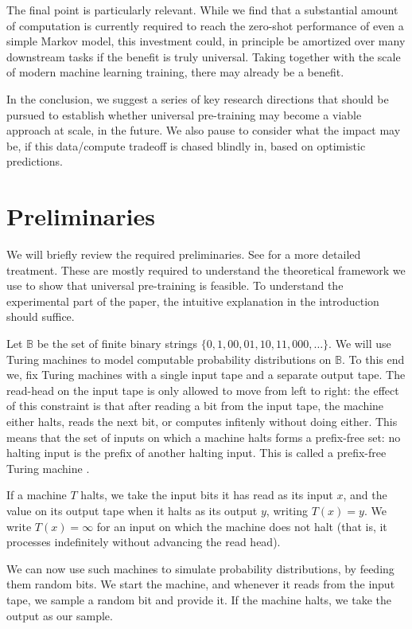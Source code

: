 \documentclass{article} %
\newcommand{\B}{\mathbb B}
\begin{document}
The final point is particularly relevant. While we find that a substantial amount of computation is currently required to reach the zero-shot performance of even a simple Markov model, this investment could, in principle be amortized over many downstream tasks if the benefit is truly universal. Taking together with the scale of modern machine learning training, there may already be a benefit. 

In the conclusion, we suggest a series of key research directions that should be pursued to establish whether universal pre-training may become a viable approach at scale, in the future. We also pause to consider what the impact may be, if this data/compute tradeoff is chased blindly in, based on optimistic predictions.

\section{Preliminaries}

We will briefly review the required preliminaries. See \cite{} for a more detailed treatment. These are mostly required to understand the theoretical framework we use to show that universal pre-training is feasible. To understand the experimental part of the paper, the intuitive explanation in the introduction should suffice.

Let $\B$ be the set of finite binary strings $\{0, 1, 00, 01, 10, 11, 000, \ldots\}$. We will use Turing machines \cite{} to model computable probability distributions on $\B$. To this end we, fix Turing machines with a single input tape and a separate output tape. The read-head on the input tape is only allowed to move from left to right: the effect of this constraint is that after reading a bit from the input tape, the machine either halts, reads the next bit, or computes infitenly without doing either. This means that the set of inputs on which a machine halts forms a prefix-free set: no halting input is the prefix of another halting input.  This is called a prefix-free Turing machine \cite{}.

If a machine $T$ halts, we take the input bits it has read as its input $x$, and the value on its output tape when it halts as its output $y$, writing $T(x) = y$. We write $T(x)=\infty$ for an input on which the machine does not halt (that is, it processes indefinitely without advancing the read head).

We can now use such machines to simulate probability distributions, by feeding them random bits. We start the machine, and whenever it reads from the input tape, we sample a random bit and provide it. If the machine halts, we take the output as our sample.\footnotemark
\end{document}
